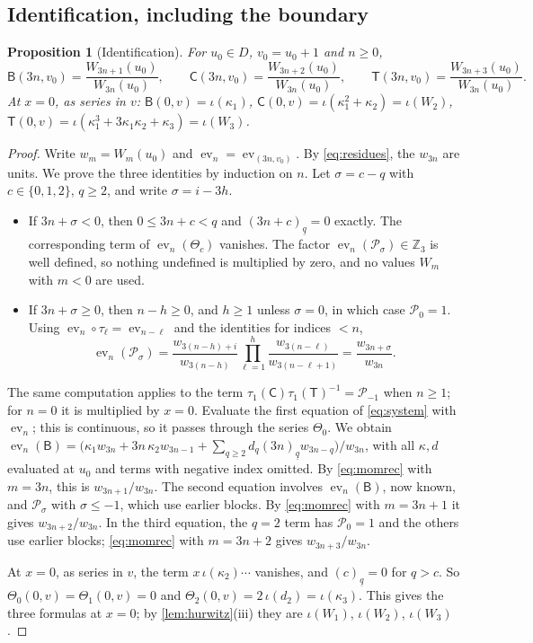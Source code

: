 \documentclass[11pt,reqno]{amsart}
\newtheorem{proposition}[theorem]{Proposition}
\theoremstyle{definition}
\theoremstyle{remark}
\theoremstyle{plain}
\newcommand{\Z}{\mathbb Z}
\newcommand{\sB}{\mathsf B}
\newcommand{\sC}{\mathsf C}
\newcommand{\sT}{\mathsf T}
\newcommand{\cP}{\mathcal P}
\newcommand{\ev}{\operatorname{ev}}
\newcommand{\fall}[2]{(#1)_{\underline{#2}}}
\begin{document}
\subsection{Identification, including the boundary}

\begin{proposition}[Identification]\label{prop:ident}
For $u_0\in D$, $v_0=u_0+1$ and $n\ge0$,
\[
\sB(3n,v_0)=\frac{W_{3n+1}(u_0)}{W_{3n}(u_0)},\qquad \sC(3n,v_0)=\frac{W_{3n+2}(u_0)}{W_{3n}(u_0)},\qquad \sT(3n,v_0)=\frac{W_{3n+3}(u_0)}{W_{3n}(u_0)} .
\]
At $x=0$, as series in $v$: $\sB(0,v)=\iota(\kappa_1)$, $\sC(0,v)=\iota(\kappa_1^2+\kappa_2)=\iota(W_2)$, $\sT(0,v)=\iota(\kappa_1^3+3\kappa_1\kappa_2+\kappa_3)=\iota(W_3)$.
\end{proposition}

\begin{proof}
Write $w_m=W_m(u_0)$ and $\ev_n=\ev_{(3n,v_0)}$. By \eqref{eq:residues}, the $w_{3n}$ are units. We prove the three identities by induction on $n$. Let $\sigma=c-q$ with $c\in\{0,1,2\}$, $q\ge2$, and write $\sigma=i-3h$.
\begin{itemize}[leftmargin=*]
\item If $3n+\sigma<0$, then $0\le3n+c<q$ and $\fall{3n+c}q=0$ exactly. The corresponding term of $\ev_n(\Theta_c)$ vanishes. The factor $\ev_n(\cP_\sigma)\in\Z_3$ is well defined, so nothing undefined is multiplied by zero, and no values $W_m$ with $m<0$ are used.
\item If $3n+\sigma\ge0$, then $n-h\ge0$, and $h\ge1$ unless $\sigma=0$, in which case $\cP_0=1$. Using $\ev_n\circ\tau_\ell=\ev_{n-\ell}$ and the identities for indices $<n$,
\[
\ev_n(\cP_\sigma)=\frac{w_{3(n-h)+i}}{w_{3(n-h)}}\prod_{\ell=1}^h\frac{w_{3(n-\ell)}}{w_{3(n-\ell+1)}}=\frac{w_{3n+\sigma}}{w_{3n}} .
\]
\end{itemize}
The same computation applies to the term $\tau_1(\sC)\tau_1(\sT)^{-1}=\cP_{-1}$ when $n\ge1$; for $n=0$ it is multiplied by $x=0$. Evaluate the first equation of \eqref{eq:system} with $\ev_n$; this is continuous, so it passes through the series $\Theta_0$. We obtain $\ev_n(\sB)=\bigl(\kappa_1w_{3n}+3n\,\kappa_2w_{3n-1}+\sum_{q\ge2}d_q\fall{3n}qw_{3n-q}\bigr)/w_{3n}$, with all $\kappa,d$ evaluated at $u_0$ and terms with negative index omitted. By \eqref{eq:momrec} with $m=3n$, this is $w_{3n+1}/w_{3n}$. The second equation involves $\ev_n(\sB)$, now known, and $\cP_\sigma$ with $\sigma\le-1$, which use earlier blocks. By \eqref{eq:momrec} with $m=3n+1$ it gives $w_{3n+2}/w_{3n}$. In the third equation, the $q=2$ term has $\cP_0=1$ and the others use earlier blocks; \eqref{eq:momrec} with $m=3n+2$ gives $w_{3n+3}/w_{3n}$.

At $x=0$, as series in $v$, the term $x\,\iota(\kappa_2)\cdots$ vanishes, and $\fall{c}{q}=0$ for $q>c$. So $\Theta_0(0,v)=\Theta_1(0,v)=0$ and $\Theta_2(0,v)=2\,\iota(d_2)=\iota(\kappa_3)$. This gives the three formulas at $x=0$; by \cref{lem:hurwitz}(iii) they are $\iota(W_1)$, $\iota(W_2)$, $\iota(W_3)$.
\end{proof}
\end{document}
